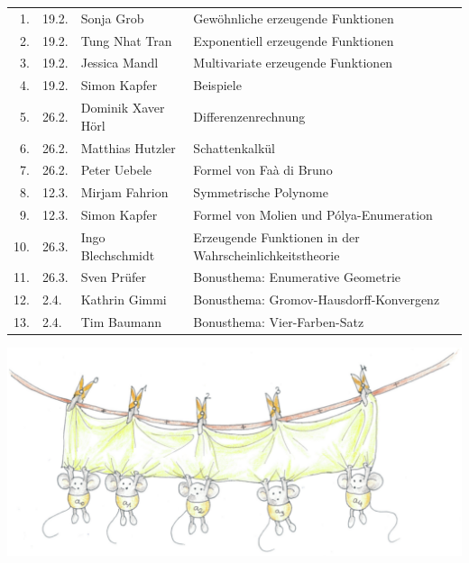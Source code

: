\documentclass[a4paper,ngerman,landscape,12pt]{scrartcl}
\begin{document}
\begin{center}
  \begin{minipage}{1.00\textwidth}
  \begin{center}
    \Large
    \begin{tabular}{r@{\quad}l@{\quad}l@{\quad}l}
        1. &
        19.2. &
        Sonja Grob &
        Gewöhnliche erzeugende Funktionen \\[0.1em]
        2. &
        19.2. &
        Tung Nhat Tran &
        Exponentiell erzeugende Funktionen \\[0.1em]
        3. &
        19.2. &
        Jessica Mandl &
        Multivariate erzeugende Funktionen \\[0.1em]
        4. &
        19.2. &
        Simon Kapfer &
        Beispiele \\[0.1em]
        5. &
        26.2. &
        Dominik Xaver Hörl &
        Differenzenrechnung \\[0.1em]
        6. &
        26.2. &
        Matthias Hutzler &
        Schattenkalkül \\[0.1em]
        7. &
        26.2. &
        Peter Uebele &
        Formel von Faà di Bruno \\[0.1em]
        8. &
        12.3. &
        Mirjam Fahrion &
        Symmetrische Polynome \\[0.1em]
        9. &
        12.3. &
        Simon Kapfer &
        Formel von Molien und Pólya-Enumeration \\[0.1em]
        10. &
        26.3. &
        Ingo Blechschmidt &
        Erzeugende Funktionen in der Wahrscheinlichkeitstheorie \\[0.1em]
        11. &
        26.3. &
        Sven Prüfer &
        Bonusthema: Enumerative Geometrie \\[0.1em]
        12. &
        2.4. &
        Kathrin Gimmi &
        Bonusthema: Gromov-Hausdorff-Konvergenz \\[0.1em]
        13. &
        2.4. &
        Tim Baumann &
        Bonusthema: Vier-Farben-Satz
    \end{tabular}

    \includegraphics[scale=0.8]{../erzeugende-funktion}
  \end{center}
  \end{minipage}
\end{center}

\end{document}
